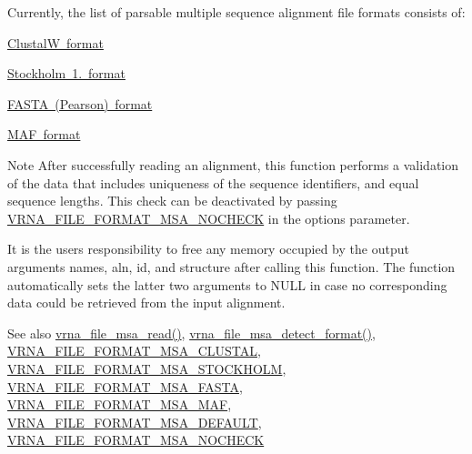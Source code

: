Currently, the list of parsable multiple sequence alignment file formats consists of\+:
\begin{DoxyItemize}
\item \mbox{\hyperlink{file_formats_msa-formats-clustal}{ClustalW format}}
\item \mbox{\hyperlink{file_formats_msa-formats-stockholm}{Stockholm 1. format}}
\item \mbox{\hyperlink{file_formats_msa-formats-fasta}{F\+A\+S\+TA (Pearson) format}}
\item \mbox{\hyperlink{file_formats_msa-formats-maf}{M\+AF format}}
\end{DoxyItemize}\begin{DoxyNote}{Note}
After successfully reading an alignment, this function performs a validation of the data that includes uniqueness of the sequence identifiers, and equal sequence lengths. This check can be deactivated by passing \mbox{\hyperlink{group__file__formats__msa_ga229fb3778ecabea4782902b69fa48fd1}{V\+R\+N\+A\+\_\+\+F\+I\+L\+E\+\_\+\+F\+O\+R\+M\+A\+T\+\_\+\+M\+S\+A\+\_\+\+N\+O\+C\+H\+E\+CK}} in the {\ttfamily options} parameter.

It is the users responsibility to free any memory occupied by the output arguments {\ttfamily names}, {\ttfamily aln}, {\ttfamily id}, and {\ttfamily structure} after calling this function. The function automatically sets the latter two arguments to {\ttfamily N\+U\+LL} in case no corresponding data could be retrieved from the input alignment.
\end{DoxyNote}
\begin{DoxySeeAlso}{See also}
\mbox{\hyperlink{group__file__formats__msa_gad02d5d12bda54611c915a1019323b7be}{vrna\+\_\+file\+\_\+msa\+\_\+read()}}, \mbox{\hyperlink{group__file__formats__msa_gade4fa8136ebb2d0f7eb3f8b59a8658e3}{vrna\+\_\+file\+\_\+msa\+\_\+detect\+\_\+format()}}, \mbox{\hyperlink{group__file__formats__msa_ga79a23de2c7249f2cccd762e475c81859}{V\+R\+N\+A\+\_\+\+F\+I\+L\+E\+\_\+\+F\+O\+R\+M\+A\+T\+\_\+\+M\+S\+A\+\_\+\+C\+L\+U\+S\+T\+AL}}, \mbox{\hyperlink{group__file__formats__msa_ga62be992445cd8ab2ad7a8fded944338b}{V\+R\+N\+A\+\_\+\+F\+I\+L\+E\+\_\+\+F\+O\+R\+M\+A\+T\+\_\+\+M\+S\+A\+\_\+\+S\+T\+O\+C\+K\+H\+O\+LM}}, \mbox{\hyperlink{group__file__formats__msa_gacf6274a2c825f34e4131404665b00604}{V\+R\+N\+A\+\_\+\+F\+I\+L\+E\+\_\+\+F\+O\+R\+M\+A\+T\+\_\+\+M\+S\+A\+\_\+\+F\+A\+S\+TA}}, \mbox{\hyperlink{group__file__formats__msa_gab3186d774c01570d2a47d0308eec4927}{V\+R\+N\+A\+\_\+\+F\+I\+L\+E\+\_\+\+F\+O\+R\+M\+A\+T\+\_\+\+M\+S\+A\+\_\+\+M\+AF}}, \mbox{\hyperlink{group__file__formats__msa_ga4acc255373831856a8417b68de8a94c0}{V\+R\+N\+A\+\_\+\+F\+I\+L\+E\+\_\+\+F\+O\+R\+M\+A\+T\+\_\+\+M\+S\+A\+\_\+\+D\+E\+F\+A\+U\+LT}}, \mbox{\hyperlink{group__file__formats__msa_ga229fb3778ecabea4782902b69fa48fd1}{V\+R\+N\+A\+\_\+\+F\+I\+L\+E\+\_\+\+F\+O\+R\+M\+A\+T\+\_\+\+M\+S\+A\+\_\+\+N\+O\+C\+H\+E\+CK}}
\end{DoxySeeAlso}

